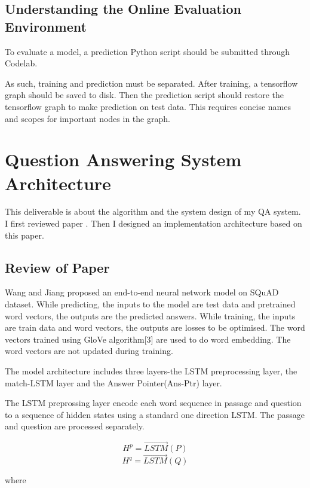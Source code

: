 \documentclass[12pt]{article}
\begin{document}
\subsection{Understanding the Online Evaluation Environment}


To evaluate a model, a prediction Python script should be submitted through Codelab.

As such, training and prediction must be separated. After training, a tensorflow graph should be saved to disk. Then the prediction script should restore the tensorflow graph to make prediction on test data. This requires concise names and scopes for important nodes in the graph.






\section{Question Answering System Architecture}\label{sec:implementpaper}

This deliverable is about the algorithm and the system design of my QA system. I first reviewed paper \cite{wang2016machine}. Then I designed an implementation architecture based on this paper.

\subsection{Review of Paper \cite{wang2016machine}}\label{theoreticalModel}

Wang and Jiang proposed an end-to-end neural network model on SQuAD dataset. While predicting, the inputs to the model are test data and pretrained word vectors, the outputs are the predicted answers. While training, the inputs are train data and word vectors, the outputs are losses to be optimised. The word vectors trained using GloVe algorithm[3] are used to do word embedding. The word vectors are not updated during training.

The model architecture includes three layers-the LSTM preprocessing layer, the match-LSTM layer and the Answer Pointer(Ans-Ptr) layer.

The LSTM preprossing layer encode each word sequence in passage and question to a sequence of hidden states using a standard one direction LSTM. The passage and question are processed separately.

$$H^p = \overrightarrow{LSTM}(P)$$
$$H^q = \overrightarrow{LSTM}(Q)$$

where
\end{document}
